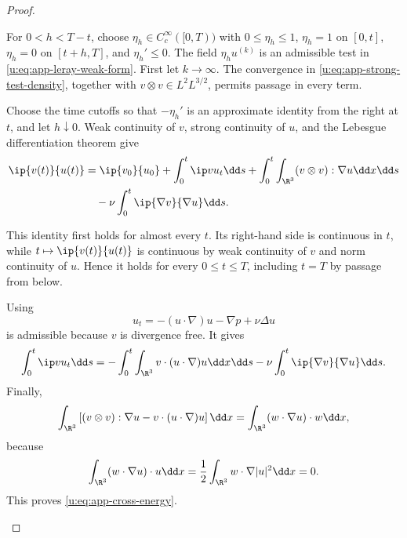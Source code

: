 \begin{proof}
\begin{samepage}
For \(0<h<T-t\), choose \(\eta_h\in C_c^\infty([0,T))\) with
\(0\le\eta_h\le1\), \(\eta_h=1\) on \([0,t]\),
\(\eta_h=0\) on \([t+h,T]\), and \(\eta_h'\le0\).  The field
\(\eta_hu^{(k)}\) is an admissible test in
\eqref{u:eq:app-leray-weak-form}.  First let \(k\to\infty\).
The convergence in \eqref{u:eq:app-strong-test-density}, together with
\(v\otimes v\in L^2L^{3/2}\), permits passage in every term.
\par
\end{samepage}
\begin{samepage}
Choose the time cutoffs so that \(-\eta_h'\) is an approximate identity from the right
at \(t\), and let \(h\downarrow0\).  Weak continuity of \(v\), strong
continuity of \(u\), and the Lebesgue differentiation theorem give
\begin{align*}
 \ip{v(t)}{u(t)}
 &=
 \ip{v_0}{u_0}
 +\int_0^t\ip v{u_t}\dd s
 +\int_0^t\int_{\R^3}(v\otimes v):\nabla u\dd x\dd s\\
 &\quad-\nu\int_0^t\ip{\nabla v}{\nabla u}\dd s.
\end{align*}
\par
\end{samepage}
This identity first holds for almost every \(t\).  Its right-hand side is
continuous in \(t\), while \(t\mapsto\ip{v(t)}{u(t)}\) is continuous by
weak continuity of \(v\) and norm continuity of \(u\).  Hence it holds for
every \(0\le t\le T\), including \(t=T\) by passage from below.
\begin{samepage}
Using
\[
 u_t=-(u\cdot\nabla)u-\nabla p+\nu\Delta u
\]
is admissible because \(v\) is divergence free.  It gives
\[
 \int_0^t\ip v{u_t}\dd s
 =
 -\int_0^t\int_{\R^3}v\cdot(u\cdot\nabla)u\dd x\dd s
 -\nu\int_0^t\ip{\nabla v}{\nabla u}\dd s.
\]
Finally,
\[
 \int_{\R^3}
 \left[(v\otimes v):\nabla u-v\cdot(u\cdot\nabla)u\right]\dd x
 =
 \int_{\R^3}(w\cdot\nabla u)\cdot w\dd x,
\]
because
\[
 \int_{\R^3}(w\cdot\nabla u)\cdot u\dd x
 =\frac12\int_{\R^3}w\cdot\nabla|u|^2\dd x=0.
\]
This proves \eqref{u:eq:app-cross-energy}.
\end{samepage}
\end{proof}

